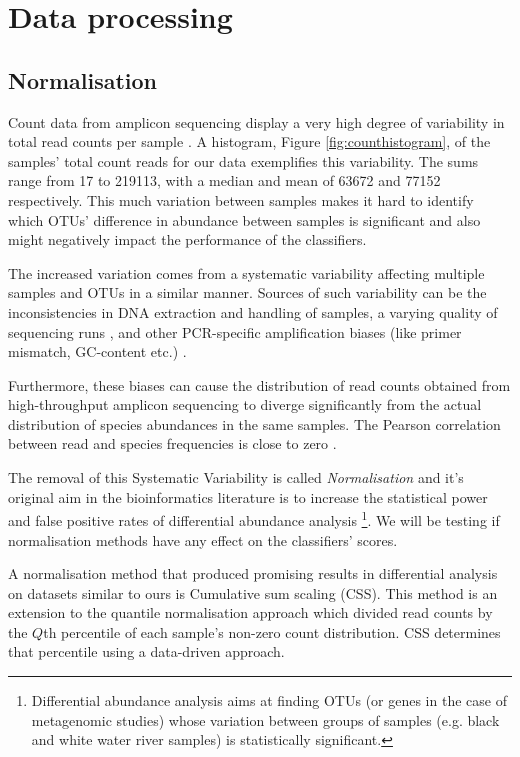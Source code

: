 \section{Data processing}
\subsection{Normalisation}

Count data from amplicon sequencing display a very high degree of variability in total read counts per sample \cite{inadmissible_rareying}. A histogram, Figure \ref{fig:counthistogram}, of the samples' total count reads for our data exemplifies this variability. The sums range from 17 to 219113, with a median and mean of 63672 and 77152 respectively. This much variation between samples makes it hard to identify which OTUs' difference in abundance between samples is significant and also might negatively impact the performance of the classifiers. 
 
 The increased variation comes from a systematic variability affecting multiple samples and OTUs in a similar manner. Sources of such variability can be the inconsistencies in DNA extraction and handling of samples,  a varying quality of sequencing runs \cite{pereira_comparison_2018}, and other PCR-specific amplification biases (like primer mismatch, GC-content etc.) \cite{abundance_nodate,krehenwinkel_estimating_2017}.
 
 Furthermore, these biases can cause the distribution of read counts obtained from high-throughput amplicon sequencing to diverge significantly from the actual distribution of species abundances in the same samples. The Pearson correlation between read and species frequencies is close to zero \cite{edgar_unbias:_2017}.
 
 The removal of this Systematic Variability is called \textit{Normalisation} and it's original aim in the bioinformatics literature is to increase the statistical power and false positive rates of differential abundance analysis \footnote{Differential abundance analysis aims at finding OTUs (or genes in the case of metagenomic studies) whose variation between groups of samples (e.g. black and white water river samples) is statistically significant.}. We will be testing if normalisation methods have any effect on the classifiers' scores.
 
 A normalisation method that produced promising results in differential analysis on datasets similar to ours is Cumulative sum scaling (CSS). This method is an extension to the quantile normalisation approach which divided read counts by the $Q$th percentile of each sample’s non-zero count distribution. CSS determines that percentile using a data-driven approach\cite{css_diff_abund}.
 
